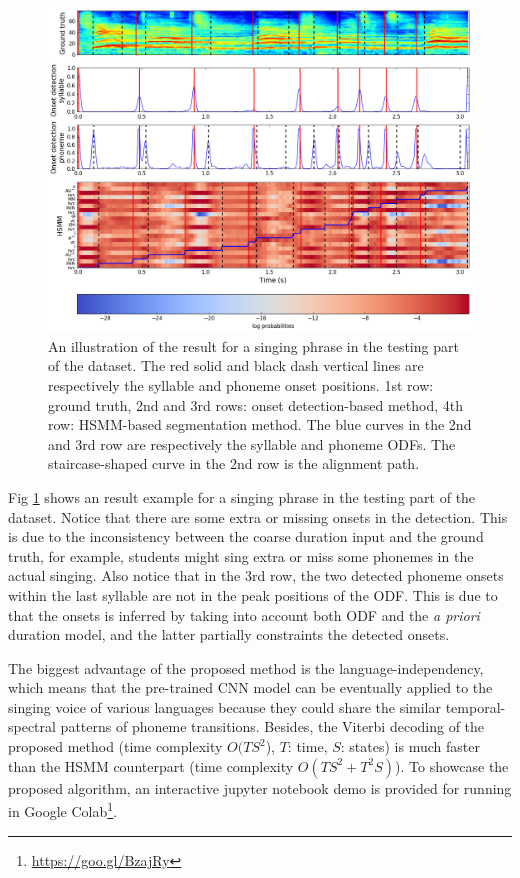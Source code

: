 \begin{figure}[ht!]
    \centering
    \includegraphics[width=\textwidth]{figs/results/ch5_results_segmentation.png}
    \caption{An illustration of the result for a singing phrase in the testing part of the dataset. The red solid and black dash vertical lines are respectively the syllable and phoneme onset positions. 1st row: ground truth, 2nd and 3rd rows: onset detection-based method, 4th row: HSMM-based segmentation method. The blue curves in the 2nd and 3rd row are respectively the syllable and phoneme ODFs. The staircase-shaped curve in the 2nd row is the alignment path.}
    \label{fig:ch5:results_example_onset}
\end{figure}

Fig \ref{fig:ch5:results_example_onset} shows an result example for a singing phrase in the testing part of the dataset. Notice that there are some extra or missing onsets in the detection. This is due to the inconsistency between the coarse duration input and the ground truth, for example, students might sing extra or miss some phonemes in the actual singing. Also notice that in the 3rd row, the two detected phoneme onsets within the last syllable are not in the peak positions of the ODF. This is due to that the onsets is inferred by taking into account both ODF and the \textit{a priori} duration model, and the latter partially constraints the detected onsets.

The biggest advantage of the proposed method is the language-independency, which means that the pre-trained CNN model can be eventually applied to the singing voice of various languages because they could share the similar temporal-spectral patterns of phoneme transitions. Besides, the Viterbi decoding of the proposed method (time complexity $O(TS^2$), $T$: time, $S$: states) is much faster than the HSMM counterpart (time complexity $O(TS^2+T^2S)$). To showcase the proposed algorithm, an interactive jupyter notebook demo is provided for running in Google Colab\footnote{\url{https://goo.gl/BzajRy}}. 

